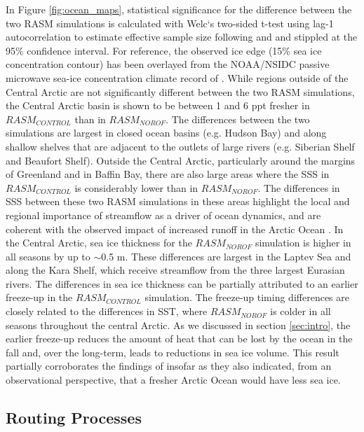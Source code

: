 \documentclass[jgrga, draft]{agutex}
\begin{document}
\begin{article}
In Figure \ref{fig:ocean_maps}, statistical significance for the difference between the two RASM simulations is calculated with Welc`s two-sided t-test using lag-1 autocorrelation to estimate effective sample size following \citet{VonStorch1999} and \citet{Wilks2006} and stippled at the 95\% confidence interval.
For reference, the observed ice edge (15\% sea ice concentration contour) has been overlayed from the NOAA/NSIDC passive microwave sea-ice concentration climate record of \citep{Meier2013}.
While regions outside of the Central Arctic are not significantly different between the two RASM simulations, the Central Arctic basin is shown to be between 1 and 6 ppt fresher in $RASM_{CONTROL}$ than in $RASM_{NOROF}$.
The differences between the two simulations are largest in closed ocean basins (e.g. Hudson Bay) and along shallow shelves that are adjacent to the outlets of large rivers (e.g. Siberian Shelf and Beaufort Shelf).
Outside the Central Arctic, particularly around the margins of Greenland and in Baffin Bay, there are also large areas where the SSS in $RASM_{CONTROL}$ is considerably lower than in $RASM_{NOROF}$.
The differences in SSS between these two RASM simulations in these areas highlight the local and regional importance of streamflow as a driver of ocean dynamics, and are coherent with the observed impact of increased runoff in the Arctic Ocean \citep [e.g.][]{Morison_2012}.
In the Central Arctic, sea ice thickness for the $RASM_{NOROF}$ simulation is higher in all seasons by up to $\sim$0.5 m.
These differences are largest in the Laptev Sea and along the Kara Shelf, which receive streamflow from the three largest Eurasian rivers.
The differences in sea ice thickness can be partially attributed to an earlier freeze-up in the $RASM_{CONTROL}$ simulation.
The freeze-up timing differences are closely related to the differences in SST, where $RASM_{NOROF}$ is colder in all seasons throughout the central Arctic.
As we discussed in section \ref{sec:intro}, the earlier freeze-up reduces the amount of heat that can be lost by the ocean in the fall and, over the long-term, leads to reductions in sea ice volume.
This result partially corroborates the findings of \citep{Morison_2012} insofar as they also indicated, from an observational perspective, that a fresher Arctic Ocean would have less sea ice.

\subsection{Routing Processes}


\end{article}
\end{document}
